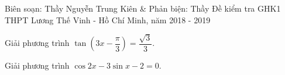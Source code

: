 \begin{name}
{Biên soạn: Thầy Nguyễn Trung Kiên \& Phản biện: Thầy }
{Đề kiểm tra GHK1 THPT Lương Thế Vinh - Hồ Chí Minh, năm 2018 - 2019}
\end{name}

\setcounter{ex}{0}\setcounter{bt}{0}

\begin{bt}%
	Giải phương trình $\tan \left(3x- \dfrac{\pi}{3} \right)= \dfrac{\sqrt{3}}{3}$.
\end{bt}

\begin{bt}%
	Giải phương trình $\cos{2x}-3 \sin{x}-2=0$.
\end{bt}

